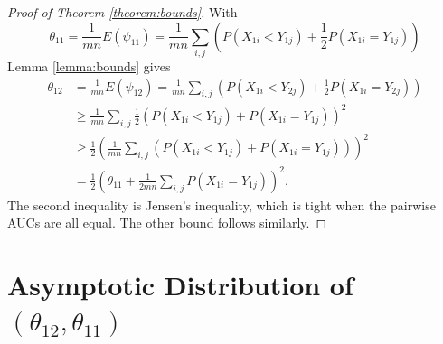 \documentclass[12pt]{article}
\DeclareMathOperator{\AUC}{AUC}
\newcommand{\E}{E}
\renewcommand{\P}{P}
\newcommand{\cind}{\perp \!\!\! \perp}
\newcommand{\aucindiv}{\theta_{11}}%
\newcommand{\aucpop}{\theta_{12}}%
\newcommand{\Kernel}{\psi}
\begin{document}
\begin{proof}[Proof of Theorem \ref{theorem:bounds}]

  With
  $$
  \aucindiv = \frac{1}{mn}\E(\Kernel_{11}) = \frac{1}{mn}\sum_{i,j}(\P(X_{1i}<Y_{1j})+\frac{1}{2}\P(X_{1i}=Y_{1j}))
  $$
  Lemma \ref{lemma:bounds} gives
  \begin{align}
    \aucpop &= \frac{1}{mn}\E(\Kernel_{12}) = \frac{1}{mn}\sum_{i,j}(P(X_{1i}<Y_{2j})+\frac{1}{2}\P(X_{1i}=Y_{2j}))\\
    &\ge \frac{1}{mn}\sum_{i,j}\frac{1}{2}(\P(X_{1i}<Y_{1j})+\P(X_{1i}=Y_{1j}))^2\\
    &\ge \frac{1}{2}\left(\frac{1}{mn}\sum_{i,j}(\P(X_{1i}<Y_{1j})+\P(X_{1i}=Y_{1j}))\right)^2\\
    &= \frac{1}{2}\left(\aucindiv + \frac{1}{2mn}\sum_{i,j}\P(X_{1i}=Y_{1j})\right)^2.
  \end{align}
  The second inequality is Jensen's inequality, which is tight when
  the pairwise AUCs are all equal.  The other bound follows similarly.
\end{proof}







\section{Asymptotic Distribution of $(\aucpop,\aucindiv)$}\label{section:asymptotics}
\end{document}
